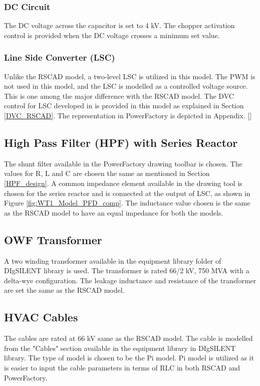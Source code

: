 \subsubsection{DC Circuit}
The \gls{DC} voltage across the capacitor is set to 4 kV. The chopper activation control is provided when the \gls{DC} voltage crosses a minimum set value. 

\subsubsection{Line Side Converter (LSC)}
Unlike the RSCAD model, a two-level \gls{LSC} is utilized in this model. The \gls{PWM} is not used in this model, and the \gls{LSC} is modelled as a controlled voltage source. This is one among the major difference with the RSCAD model. The \gls{DVC} control for \gls{LSC} developed in \cite{korai_dynamic_2019} is provided in this model as explained in Section \ref{DVC_RSCAD}. The representation in PowerFactory is depicted in Appendix. [] 

\subsection{High Pass Filter (HPF) with Series Reactor}
The shunt filter available in the PowerFactory drawing toolbar is chosen. The values for R, L and C are chosen the same as mentioned in Section \ref{HPF_design}. A common impedance element available in the drawing tool is chosen for the series reactor and is connected at the output of \gls{LSC}, as shown in Figure \ref{fig:WT1_Model_PFD_comp}. The inductance value chosen is the same as the RSCAD model to have an equal impedance for both the models.  

\subsection{OWF Transformer}
A two winding transformer available in the equipment library folder of DIgSILENT library is used. The transformer is rated 66/2 kV, 750 MVA with a delta-wye configuration. The leakage inductance and resistance of the transformer are set the same as the RSCAD model.

\subsection{HVAC Cables}
The cables are rated at 66 kV same as the RSCAD model. The cable is modelled from the "Cables" section available in the equipment library in DIgSILENT library. The type of model is chosen to be the Pi model. %
Pi model is utilized as it is easier to input the cable parameters in terms of RLC in both RSCAD and PowerFactory.

